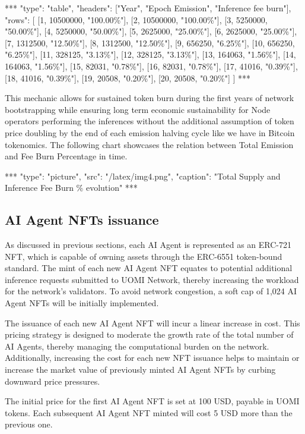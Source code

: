 \documentclass{article}
\begin{document}
\begin{center}
***
"type": "table",
"headers": ["Year", "Epoch Emission", "Inference fee burn"],
"rows": [
  [1, 10500000, "100.00\%"],
  [2, 10500000, "100.00\%"],
  [3, 5250000, "50.00\%"],
  [4, 5250000, "50.00\%"],
  [5, 2625000, "25.00\%"],
  [6, 2625000, "25.00\%"],
  [7, 1312500, "12.50\%"],
  [8, 1312500, "12.50\%"],
  [9, 656250, "6.25\%"],
  [10, 656250, "6.25\%"],
  [11, 328125, "3.13\%"],
  [12, 328125, "3.13\%"],
  [13, 164063, "1.56\%"],
  [14, 164063, "1.56\%"],
  [15, 82031, "0.78\%"],
  [16, 82031, "0.78\%"],
  [17, 41016, "0.39\%"],
  [18, 41016, "0.39\%"],
  [19, 20508, "0.20\%"],
  [20, 20508, "0.20\%"]
]
***
\end{center}

This mechanic allows for sustained token burn during the first years of network bootstrapping while ensuring long term economic sustainability for Node operators performing the inferences without the additional assumption of token price doubling by the end of each emission halving cycle like we have in Bitcoin tokenomics. The following chart showcases the relation between Total Emission and Fee Burn Percentage in time.




***
"type": "picture",
"src": "/latex/img4.png",
"caption": "Total Supply and Inference Fee Burn \% evolution"
***


\subsection{AI Agent NFTs issuance}

As discussed in previous sections, each AI Agent is represented as an ERC-721 NFT, which is capable of owning assets through the ERC-6551 token-bound standard. The mint of each new AI Agent NFT equates to potential additional inference requests submitted to UOMI Network, thereby increasing the workload for the network's validators. To avoid network congestion, a soft cap of 1,024 AI Agent NFTs will be initially implemented.

The issuance of each new AI Agent NFT will incur a linear increase in cost. This pricing strategy is designed to moderate the growth rate of the total number of AI Agents, thereby managing the computational burden on the network. Additionally, increasing the cost for each new NFT issuance helps to maintain or increase the market value of previously minted AI Agent NFTs by curbing downward price pressures.

The initial price for the first AI Agent NFT is set at 100 USD, payable in UOMI tokens. Each subsequent AI Agent NFT minted will cost 5 USD more than the previous one.
\end{document}
